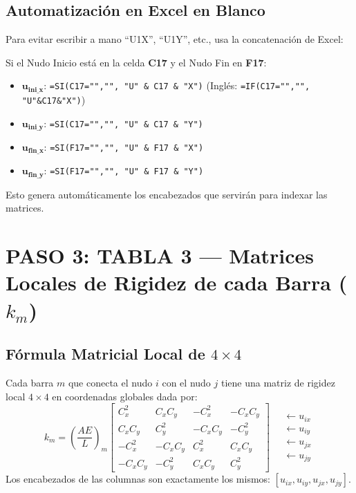 \documentclass[10pt,a4paper]{article}
\begin{document}
\subsection{Automatización en Excel en Blanco}
Para evitar escribir a mano ``U1X'', ``U1Y'', etc., usa la concatenación de Excel:
\begin{excelbox}
Si el Nudo Inicio está en la celda \textbf{C17} y el Nudo Fin en \textbf{F17}:
\begin{itemize}
    \item $\mathbf{u_{ini\_x}}$: \texttt{=SI(C17="","", "U" \& C17 \& "X")} \quad (Inglés: \texttt{=IF(C17="","", "U"\&C17\&"X")})
    \item $\mathbf{u_{ini\_y}}$: \texttt{=SI(C17="","", "U" \& C17 \& "Y")}
    \item $\mathbf{u_{fin\_x}}$: \texttt{=SI(F17="","", "U" \& F17 \& "X")}
    \item $\mathbf{u_{fin\_y}}$: \texttt{=SI(F17="","", "U" \& F17 \& "Y")}
\end{itemize}
Esto genera automáticamente los encabezados que servirán para indexar las matrices.
\end{excelbox}

\newpage

\section{PASO 3: TABLA 3 — Matrices Locales de Rigidez de cada Barra (\texorpdfstring{$k_m$}{km})}

\subsection{Fórmula Matricial Local de $4 \times 4$}
Cada barra $m$ que conecta el nudo $i$ con el nudo $j$ tiene una matriz de rigidez local $4\times 4$ en coordenadas globales dada por:
\[
k_m = \left(\frac{AE}{L}\right)_m 
\begin{bmatrix}
C_x^2 & C_x C_y & -C_x^2 & -C_x C_y \\
C_x C_y & C_y^2 & -C_x C_y & -C_y^2 \\
-C_x^2 & -C_x C_y & C_x^2 & C_x C_y \\
-C_x C_y & -C_y^2 & C_x C_y & C_y^2
\end{bmatrix}
\quad
\begin{matrix}
\leftarrow u_{ix} \\
\leftarrow u_{iy} \\
\leftarrow u_{jx} \\
\leftarrow u_{jy}
\end{matrix}
\]
Los encabezados de las columnas son exactamente los mismos: $[u_{ix}, u_{iy}, u_{jx}, u_{jy}]$.
\end{document}
